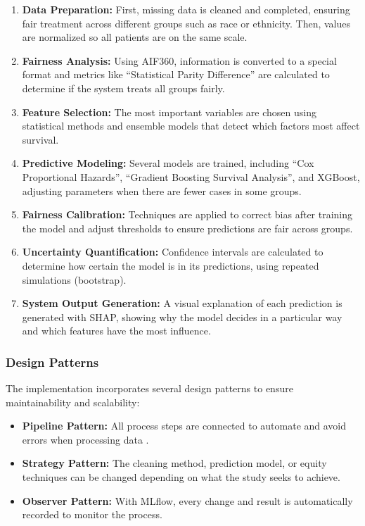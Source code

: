 \begin{enumerate}
    \item \textbf{Data Preparation:} First, missing data is cleaned and completed, ensuring fair treatment across different groups such as race or ethnicity. Then, values are normalized so all patients are on the same scale.
    
    \item \textbf{Fairness Analysis:} Using AIF360, information is converted to a special format and metrics like ``Statistical Parity Difference'' are calculated to determine if the system treats all groups fairly.
    
    \item \textbf{Feature Selection:} The most important variables are chosen using statistical methods and ensemble models that detect which factors most affect survival.
    
    \item \textbf{Predictive Modeling:} Several models are trained, including ``Cox Proportional Hazards'', ``Gradient Boosting Survival Analysis'', and XGBoost, adjusting parameters when there are fewer cases in some groups.
    
    \item \textbf{Fairness Calibration:} Techniques are applied to correct bias after training the model and adjust thresholds to ensure predictions are fair across groups.
    
    \item \textbf{Uncertainty Quantification:} Confidence intervals are calculated to determine how certain the model is in its predictions, using repeated simulations (bootstrap).
    
    \item \textbf{System Output Generation:} A visual explanation of each prediction is generated with SHAP, showing why the model decides in a particular way and which features have the most influence.
\end{enumerate}

\subsubsection{Design Patterns}

The implementation incorporates several design patterns to ensure maintainability and scalability:

\begin{itemize}
    \item \textbf{Pipeline Pattern:} All process steps are connected to automate and avoid errors when processing data \cite{datacamp_mlops}.
    
    \item \textbf{Strategy Pattern:} The cleaning method, prediction model, or equity techniques can be changed depending on what the study seeks to achieve.
    
    \item \textbf{Observer Pattern:} With MLflow, every change and result is automatically recorded to monitor the process.
\end{itemize}

